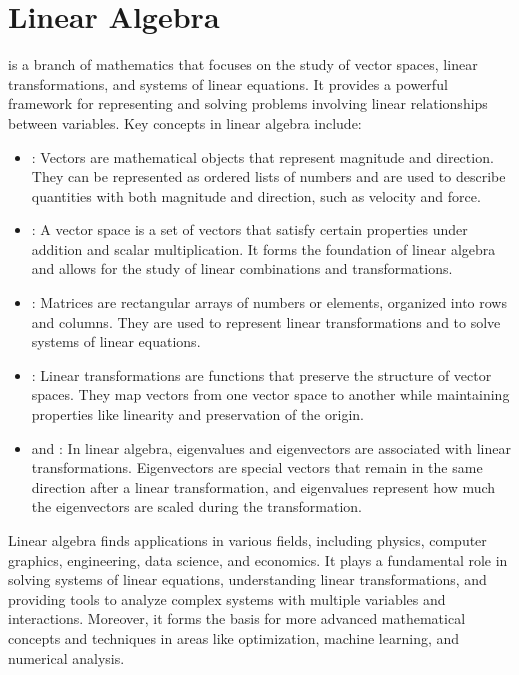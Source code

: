 \chapter{Linear Algebra}
\thispagestyle{fancy}

 is a branch of mathematics that focuses on the study of vector spaces, linear transformations, and systems of linear equations. It provides a powerful framework for representing and solving problems involving linear relationships between variables. Key concepts in linear algebra include:

\begin{itemize}
	\item {}: Vectors are mathematical objects that represent magnitude and direction. They can be represented as ordered lists of numbers and are used to describe quantities with both magnitude and direction, such as velocity and force.
	
	\item {}: A vector space is a set of vectors that satisfy certain properties under addition and scalar multiplication. It forms the foundation of linear algebra and allows for the study of linear combinations and transformations.
	
	\item {}: Matrices are rectangular arrays of numbers or elements, organized into rows and columns. They are used to represent linear transformations and to solve systems of linear equations.
	
	\item {}: Linear transformations are functions that preserve the structure of vector spaces. They map vectors from one vector space to another while maintaining properties like linearity and preservation of the origin.
	
	\item {} and : In linear algebra, eigenvalues and eigenvectors are associated with linear transformations. Eigenvectors are special vectors that remain in the same direction after a linear transformation, and eigenvalues represent how much the eigenvectors are scaled during the transformation.
\end{itemize}

Linear algebra finds applications in various fields, including physics, computer graphics, engineering, data science, and economics. It plays a fundamental role in solving systems of linear equations, understanding linear transformations, and providing tools to analyze complex systems with multiple variables and interactions. Moreover, it forms the basis for more advanced mathematical concepts and techniques in areas like optimization, machine learning, and numerical analysis.



